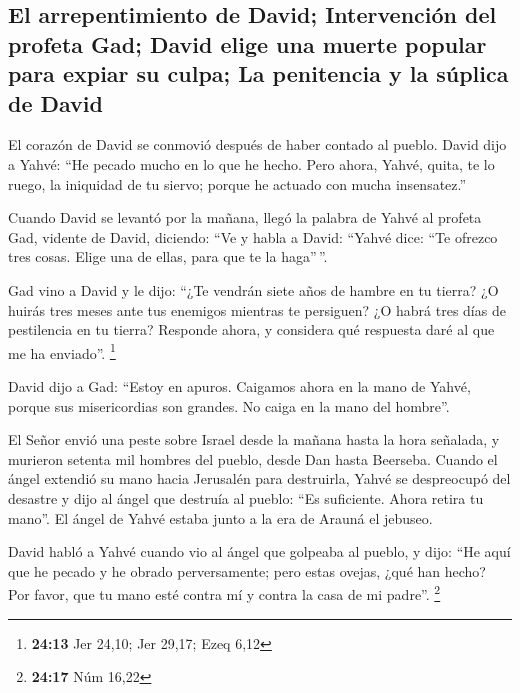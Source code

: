 \begin{paracol}{2}
\hypertarget{el-arrepentimiento-de-david-intervenciuxf3n-del-profeta-gad-david-elige-una-muerte-popular-para-expiar-su-culpa-la-penitencia-y-la-suxfaplica-de-david}{%
\subsection{El arrepentimiento de David; Intervención del profeta Gad;
David elige una muerte popular para expiar su culpa; La penitencia y la
súplica de
David}\label{el-arrepentimiento-de-david-intervenciuxf3n-del-profeta-gad-david-elige-una-muerte-popular-para-expiar-su-culpa-la-penitencia-y-la-suxfaplica-de-david}}

 El corazón de David se conmovió después de haber contado
al pueblo. David dijo a Yahvé: ``He pecado mucho en lo que he hecho.
Pero ahora, Yahvé, quita, te lo ruego, la iniquidad de tu siervo; porque
he actuado con mucha insensatez.''

 Cuando David se levantó por la mañana, llegó la palabra
de Yahvé al profeta Gad, vidente de David, diciendo: 
``Ve y habla a David: ``Yahvé dice: ``Te ofrezco tres cosas. Elige una
de ellas, para que te la haga''\,''.

 Gad vino a David y le dijo: ``¿Te vendrán siete años de
hambre en tu tierra? ¿O huirás tres meses ante tus enemigos mientras te
persiguen? ¿O habrá tres días de pestilencia en tu tierra? Responde
ahora, y considera qué respuesta daré al que me ha enviado''.
\footnote{\textbf{24:13} Jer 24,10; Jer 29,17; Ezeq 6,12}

 David dijo a Gad: ``Estoy en apuros. Caigamos ahora en
la mano de Yahvé, porque sus misericordias son grandes. No caiga en la
mano del hombre''.

 El Señor envió una peste sobre Israel desde la mañana
hasta la hora señalada, y murieron setenta mil hombres del pueblo, desde
Dan hasta Beerseba.  Cuando el ángel extendió su mano
hacia Jerusalén para destruirla, Yahvé se despreocupó del desastre y
dijo al ángel que destruía al pueblo: ``Es suficiente. Ahora retira tu
mano''. El ángel de Yahvé estaba junto a la era de Arauná el jebuseo.

 David habló a Yahvé cuando vio al ángel que golpeaba al
pueblo, y dijo: ``He aquí que he pecado y he obrado perversamente; pero
estas ovejas, ¿qué han hecho? Por favor, que tu mano esté contra mí y
contra la casa de mi padre''. \footnote{\textbf{24:17} Núm 16,22}


\end{paracol}
